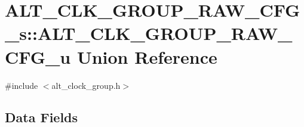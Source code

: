 \hypertarget{unionALT__CLK__GROUP__RAW__CFG__s_1_1ALT__CLK__GROUP__RAW__CFG__u}{}\section{A\+L\+T\+\_\+\+C\+L\+K\+\_\+\+G\+R\+O\+U\+P\+\_\+\+R\+A\+W\+\_\+\+C\+F\+G\+\_\+s\+::A\+L\+T\+\_\+\+C\+L\+K\+\_\+\+G\+R\+O\+U\+P\+\_\+\+R\+A\+W\+\_\+\+C\+F\+G\+\_\+u Union Reference}
\label{unionALT__CLK__GROUP__RAW__CFG__s_1_1ALT__CLK__GROUP__RAW__CFG__u}


{\ttfamily \#include $<$alt\+\_\+clock\+\_\+group.\+h$>$}

\subsection*{Data Fields}
